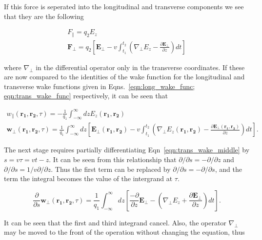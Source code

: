 If this force is seperated into the longitudinal and transverse components we see that they are the following

\begin{align}
F_{\parallel} = q_{2} E_{z} \\
\mathbf{F}_{\perp} = q_{2}  \left[\mathbf{E_{\perp}} - v \int^{t_{2}}_{t_{1}}\left(  \nabla_{\perp}E_{z}  - \frac{\partial\mathbf{E}_{\perp}}{\partial z} \right) dt  \right]
\end{align}

where $\nabla_{\perp}$ in the differential operator only in the transverse coordinates. If these are now compared to the identities of the wake function for the longitudinal and transverse wake functions given in Eqns.~\ref{eqn:long_wake_func; eqn:trans_wake_func} respectively, it can be seen that

\begin{align}
w_{\parallel}\left( \mathbf{r_{1}}, \mathbf{r_{2}}, \tau   \right) = -\frac{1}{q_{1}} \int^{\infty}_{-\infty} dz E_{z} \left( \mathbf{r_{1}}, \mathbf{r_{2}} \right) \\
\mathbf{w}_{\perp} \left(\mathbf{r_{1}}, \mathbf{r_{2}}, \tau   \right) = \frac{1}{q_{1}} \int^{\infty}_{-\infty} dz \left[ \mathbf{E_{\perp}}\left(\mathbf{r_{1}}, \mathbf{r_{2}} \right) - v   \int^{t_{2}}_{t_{1}}\left(  \nabla_{\perp}E_{z}\left(\mathbf{r_{1}}, \mathbf{r_{2}} \right)  - \frac{\partial\mathbf{E}_{\perp}\left(\mathbf{r_{1}}, \mathbf{r_{2}} \right)}{\partial z} \right) dt \right] \label{eqn:trans_wake_middle}.
\end{align}

The next stage requires partially differentiating Eqn~\ref{eqn:trans_wake_middle} by $s = v \tau = vt - z$. It can be seen from this relationship that $\partial / \partial s = - \partial / \partial z$ and $\partial / \partial s = 1/v \partial / \partial z$. Thus the first term can be replaced by $\partial / \partial s = - \partial / \partial s$, and the term the integral becomes the value of the intergrand at $\tau$.

\begin{equation}
\frac{\partial}{\partial s}\mathbf{w}_{\perp} \left(\mathbf{r_{1}}, \mathbf{r_{2}}, \tau   \right) = \frac{1}{q_{1}} \int^{\infty}_{-\infty} dz \left[ \frac{-\partial}{\partial z}\mathbf{E_{\perp}} - \left(  \nabla_{\perp}E_{z} + \frac{\partial\mathbf{E}_{\perp}}{\partial z} \right) dt \right].
\end{equation} 

It can be seen that the first and third integrand cancel. Also, the operator $\nabla_{\perp}$ may be moved to the front of the operation without changing the equation, thus


